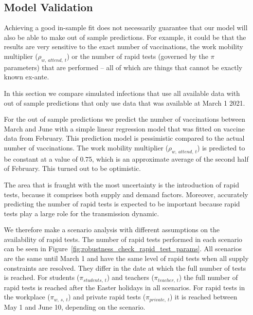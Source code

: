 \subsection{Model Validation}
\label{subsec:model_validation}

Achieving a good in-sample fit does not necessarily guarantee that our model will also be
able to make out of sample predictions. For example, it could be that the results are
very sensitive to the exact number of vaccinations, the work mobility multiplier
($\rho_{w,\:attend,\:t}$) or the number of rapid tests (governed by the $\pi$ parameters)
that are performed -- all of which are things that cannot be exactly known ex-ante.

In this section we compare simulated infections that use all available data with
out of sample predictions that only use data that was available at March 1 2021.

For the out of sample predictions we predict the number of vaccinations between March and
June with a simple linear regression model that was fitted on vaccine data from February.
This prediction model is pessimistic compared to the actual number of vaccinations. The
work mobility multiplier ($\rho_{w,\:attend,\:t}$) is predicted to be constant at a value
of 0.75, which is an approximate average of the second half of February. This turned out
to be optimistic.

The area that is fraught with the most uncertainty is the introduction of rapid tests,
because it comprises both supply and demand factors. Moreover, accurately predicting the
number of rapid tests is expected to be important because rapid tests play a large role
for the transmission dynamic.

We therefore make a scenario analysis with different assumptions on the availability of
rapid tests. The number of rapid tests performed in each scenario can be seen in
Figure~\ref{fig:robustness_check_rapid_test_params}. All scenarios are the same until
March 1 and have the same level of rapid tests when all supply constraints are resolved.
They differ in the date at which the full number of tests is reached. For students
($\pi_{students,\:t}$) and teachers ($\pi_{teacher,\:t}$) the full number of rapid tests
is reached after the Easter holidays in all scenarios. For rapid tests in the workplace
($\pi_{w,\:s,\:t}$) and private rapid tests ($\pi_{private,\:t}$) it is reached between
May 1 and June 10, depending on the scenario.


